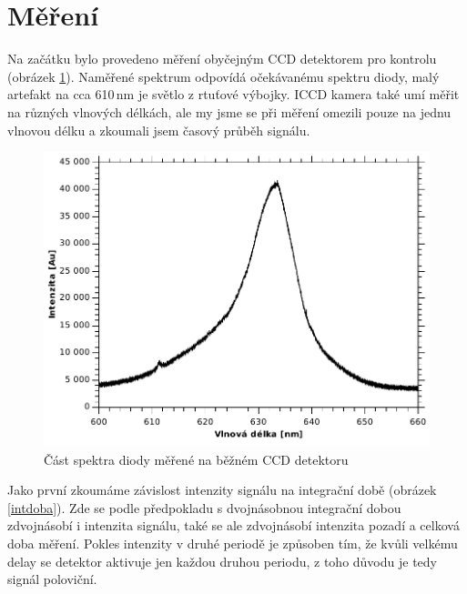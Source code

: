 \documentclass[12pt]{article}
\begin{document}
\section{Měření}
Na začátku bylo provedeno měření obyčejným CCD detektorem pro kontrolu (obrázek \ref{ccd}). Naměřené spektrum odpovídá očekávanému spektru diody, malý artefakt na cca 610\,nm je světlo z rtuťové výbojky. ICCD kamera také umí měřit na různých vlnových délkách, ale my jsme se při měření omezili pouze na jednu vlnovou délku a zkoumali jsem časový průběh signálu.


\begin{figure}[htbp]
\begin{center}
\includegraphics[width=12cm]{ccddioda.pdf}
\caption{Část spektra diody měřené na běžném CCD detektoru}
\label{ccd}
\end{center}
\end{figure}

Jako první zkoumáme závislost intenzity signálu na integrační době (obrázek \ref{intdoba}). Zde se podle předpokladu s dvojnásobnou integrační dobou zdvojnásobí i intenzita signálu, také se ale zdvojnásobí intenzita pozadí a celková doba měření. Pokles intenzity v druhé periodě je způsoben tím, že kvůli velkému delay se detektor aktivuje jen každou druhou periodu, z toho důvodu je tedy signál poloviční.
\end{document}
